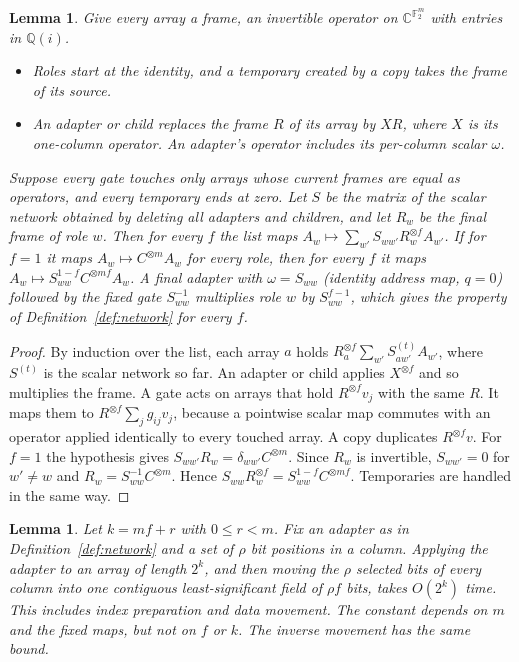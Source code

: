 \documentclass[11pt]{article}
\newtheorem{lemma}[theorem]{Lemma}
\theoremstyle{definition}
\newcommand{\F}{\mathbb F}
\begin{document}
\begin{lemma}\label{lem:columns}
Give every array a \emph{frame}, an invertible operator on
$\mathbb C^{\F_2^m}$ with entries in $\mathbb Q(i)$.
\begin{itemize}
\item Roles start at the identity, and a temporary created by a copy takes the
  frame of its source.
\item An adapter or child replaces the frame $R$ of its array by $XR$, where $X$
  is its one-column operator. An adapter's operator includes its per-column
  scalar $\omega$.
\end{itemize}
Suppose every gate touches only arrays whose current frames are equal as
operators, and every temporary ends at zero. Let $S$ be the matrix of the
scalar network obtained by deleting all adapters and children, and let $R_w$ be
the final frame of role $w$. Then for every $f$ the list maps
$A_w\mapsto\sum_{w'}S_{ww'}R_w^{\otimes f}A_{w'}$. If for $f=1$ it maps
$A_w\mapsto C^{\otimes m}A_w$ for every role, then for every $f$ it maps
$A_w\mapsto S_{ww}^{1-f}C^{\otimes mf}A_w$. A final adapter with $\omega=S_{ww}$
(identity address map, $q=0$) followed by the fixed gate $S_{ww}^{-1}$ multiplies
role $w$ by $S_{ww}^{f-1}$, which gives the property of
Definition~\ref{def:network} for every $f$.
\end{lemma}

\begin{proof}
By induction over the list, each array $a$ holds
$R_a^{\otimes f}\sum_{w'}S^{(t)}_{aw'}A_{w'}$, where $S^{(t)}$ is the scalar
network so far. An adapter or child applies $X^{\otimes f}$ and so multiplies the
frame. A gate acts on arrays that hold $R^{\otimes f}v_j$ with the same $R$. It
maps them to $R^{\otimes f}\sum_jg_{ij}v_j$, because a pointwise scalar map
commutes with an operator applied identically to every touched array. A copy
duplicates $R^{\otimes f}v$. For $f=1$ the hypothesis gives
$S_{ww'}R_w=\delta_{ww'}C^{\otimes m}$. Since $R_w$ is invertible, $S_{ww'}=0$ for
$w'\ne w$ and $R_w=S_{ww}^{-1}C^{\otimes m}$. Hence
$S_{ww}R_w^{\otimes f}=S_{ww}^{1-f}C^{\otimes mf}$. Temporaries are handled in the
same way.
\end{proof}

\begin{lemma}\label{lem:address}
Let $k=mf+r$ with $0\le r<m$. Fix an adapter as in
Definition~\ref{def:network} and a set of $\rho$ bit positions in a column.
Applying the adapter to an array of length $2^k$, and then moving the $\rho$
selected bits of every column into one contiguous least-significant field of
$\rho f$ bits, takes $O(2^k)$ time. This includes index preparation and data
movement. The constant depends on $m$ and the fixed maps, but not on $f$ or $k$.
The inverse movement has the same bound.
\end{lemma}
\end{document}

